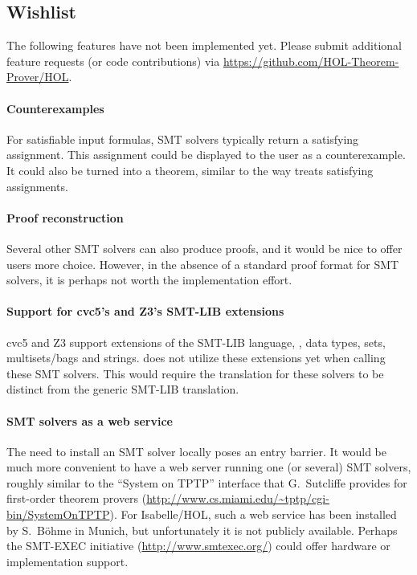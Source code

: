\subsection{Wishlist}

The following features have not been implemented yet.  Please submit
additional feature requests (or code contributions) via
\url{https://github.com/HOL-Theorem-Prover/HOL}.

\paragraph{Counterexamples}

For satisfiable input formulas, SMT solvers typically return a
satisfying assignment.  This assignment could be displayed to the
\HOL{} user as a counterexample.  It could also be turned into a
theorem, similar to the way  treats satisfying
assignments.

\paragraph{Proof reconstruction}

Several other SMT solvers can also produce proofs, and it would be
nice to offer \HOL{} users more choice.  However, in the absence of a
standard proof format for SMT solvers, it is perhaps not worth the
implementation effort.

\paragraph{Support for cvc5's and Z3's SMT-LIB extensions}

cvc5 and Z3 support extensions of the SMT-LIB language, \eg, data
types, sets, multisets/bags and strings.  does not
utilize these extensions yet when calling these SMT solvers. This
would require the translation for these solvers to be distinct from
the generic SMT-LIB translation.

\paragraph{SMT solvers as a web service}

The need to install an SMT solver locally poses an entry barrier.  It
would be much more convenient to have a web server running one (or
several) SMT solvers, roughly similar to the ``System on TPTP''
interface that G.~Sutcliffe provides for first-order theorem provers
(\url{http://www.cs.miami.edu/~tptp/cgi-bin/SystemOnTPTP}).  For
Isabelle/HOL, such a web service has been installed by S.~B{\"o}hme in
Munich, but unfortunately it is not publicly available.  Perhaps the
SMT-EXEC initiative (\url{http://www.smtexec.org/}) could offer
hardware or implementation support.


